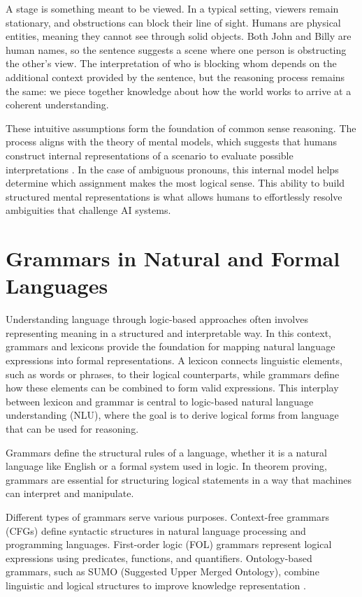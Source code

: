 \documentclass[english,version-2020-11]{uzl-thesis}
\begin{document}
A stage is something meant to be viewed. In a typical setting, viewers remain stationary, and obstructions can block their line of sight. Humans are physical entities, meaning they cannot see through solid objects. Both John and Billy are human names, so the sentence suggests a scene where one person is obstructing the other’s view. The interpretation of who is blocking whom depends on the additional context provided by the sentence, but the reasoning process remains the same: we piece together knowledge about how the world works to arrive at a coherent understanding.

These intuitive assumptions form the foundation of common sense reasoning. The process aligns with the theory of mental models, which suggests that humans construct internal representations of a scenario to evaluate possible interpretations \cite{JohnsonLaird1989}. In the case of ambiguous pronouns, this internal model helps determine which assignment makes the most logical sense. This ability to build structured mental representations is what allows humans to effortlessly resolve ambiguities that challenge AI systems.

\section{Grammars in Natural and Formal Languages}

Understanding language through logic-based approaches often involves representing meaning in a structured and interpretable way. In this context, grammars and lexicons provide the foundation for mapping natural language expressions into formal representations. A lexicon connects linguistic elements, such as words or phrases, to their logical counterparts, while grammars define how these elements can be combined to form valid expressions. This interplay between lexicon and grammar is central to logic-based natural language understanding (NLU), where the goal is to derive logical forms from language that can be used for reasoning.

Grammars define the structural rules of a language, whether it is a natural language like English or a formal system used in logic. In theorem proving, grammars are essential for structuring logical statements in a way that machines can interpret and manipulate.

Different types of grammars serve various purposes. Context-free grammars (CFGs) define syntactic structures in natural language processing and programming languages. First-order logic (FOL) grammars represent logical expressions using predicates, functions, and quantifiers. Ontology-based grammars, such as SUMO (Suggested Upper Merged Ontology), combine linguistic and logical structures to improve knowledge representation \cite{Niles2001}.
\end{document}
